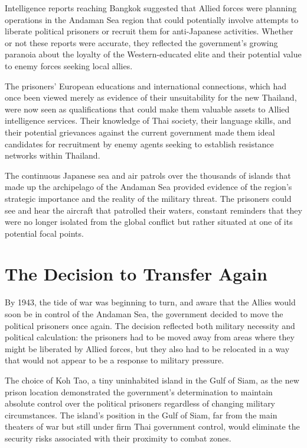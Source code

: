 \documentclass[
  Letterpaper,
]{scrbook}
\begin{document}
Intelligence reports reaching Bangkok suggested that Allied forces were
planning operations in the Andaman Sea region that could potentially
involve attempts to liberate political prisoners or recruit them for
anti-Japanese activities. Whether or not these reports were accurate,
they reflected the government's growing paranoia about the loyalty of
the Western-educated elite and their potential value to enemy forces
seeking local allies.

The prisoners' European educations and international connections, which
had once been viewed merely as evidence of their unsuitability for the
new Thailand, were now seen as qualifications that could make them
valuable assets to Allied intelligence services. Their knowledge of Thai
society, their language skills, and their potential grievances against
the current government made them ideal candidates for recruitment by
enemy agents seeking to establish resistance networks within Thailand.

The continuous Japanese sea and air patrols over the thousands of
islands that made up the archipelago of the Andaman Sea provided
evidence of the region's strategic importance and the reality of the
military threat. The prisoners could see and hear the aircraft that
patrolled their waters, constant reminders that they were no longer
isolated from the global conflict but rather situated at one of its
potential focal points.

\section{The Decision to Transfer
Again}\label{the-decision-to-transfer-again}

By 1943, the tide of war was beginning to turn, and aware that the
Allies would soon be in control of the Andaman Sea, the government
decided to move the political prisoners once again. The decision
reflected both military necessity and political calculation: the
prisoners had to be moved away from areas where they might be liberated
by Allied forces, but they also had to be relocated in a way that would
not appear to be a response to military pressure.

The choice of Koh Tao, a tiny uninhabited island in the Gulf of Siam, as
the new prison location demonstrated the government's determination to
maintain absolute control over the political prisoners regardless of
changing military circumstances. The island's position in the Gulf of
Siam, far from the main theaters of war but still under firm Thai
government control, would eliminate the security risks associated with
their proximity to combat zones.
\end{document}
